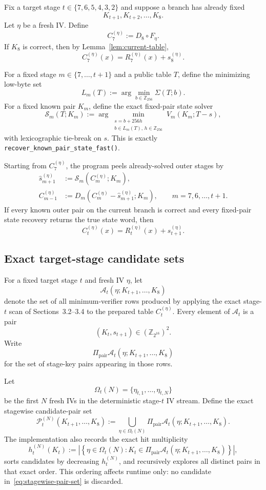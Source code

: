 \documentclass[11pt]{article}
\newcommand{\Z}[1]{\mathbb{Z}_{#1}}
\begin{document}
Fix a target stage $t\in\{7,6,5,4,3,2\}$ and suppose a branch has already fixed
\[
K_{t+1},K_{t+2},\dots,K_8.
\]
Let $\eta$ be a fresh IV. Define
\[
C_7^{(\eta)}:=D_8\circ F_\eta.
\]
If $K_8$ is correct, then by Lemma~\ref{lem:current-table},
\[
C_7^{(\eta)}(x)=R_7^{(\eta)}(x)+s_8^{(\eta)}.
\]

For a fixed stage $m\in\{7,\dots,t+1\}$ and a public table $T$, define the minimizing low-byte set
\[
L_m(T):=\arg\min_{b\in\Z{256}}\Sigma(T;b).
\]
For a fixed known pair $K_m$, define the exact fixed-pair state solver
\begin{equation}
\label{eq:fixed-pair-state-solver}
\mathcal{S}_m(T;K_m)
:=
\arg\min_{\substack{s=b+256h\\ b\in L_m(T),\,h\in\Z{256}}}
V_m(K_m;T-s),
\end{equation}
with lexicographic tie-break on $s$. This is exactly \texttt{recover\_known\_pair\_state\_fast()}.

Starting from $C_7^{(\eta)}$, the program peels already-solved outer stages by
\begin{align}
\widehat{s}_{m+1}^{(\eta)} &:= \mathcal{S}_m(C_m^{(\eta)};K_m), \label{eq:stagewise-state}\\
C_{m-1}^{(\eta)} &:= D_m\!\left(C_m^{(\eta)}-\widehat{s}_{m+1}^{(\eta)};K_m\right), \qquad m=7,6,\dots,t+1. \label{eq:stagewise-peel}
\end{align}
If every known outer pair on the current branch is correct and every fixed-pair state recovery returns the true state word, then
\[
C_t^{(\eta)}(x)=R_t^{(\eta)}(x)+s_{t+1}^{(\eta)}.
\]

\subsection{Exact target-stage candidate sets}
For a fixed target stage $t$ and fresh IV $\eta$, let
\[
\mathcal{A}_t(\eta;K_{t+1},\dots,K_8)
\]
denote the set of all minimum-verifier rows produced by applying the exact stage-$t$ scan of Sections~3.2--3.4 to the prepared table $C_t^{(\eta)}$. Every element of $\mathcal{A}_t$ is a pair
\[
(K_t,s_{t+1})\in(\Z{2^{16}})^2.
\]
Write
\[
\Pi_{\mathrm{pair}}\mathcal{A}_t(\eta;K_{t+1},\dots,K_8)
\]
for the set of stage-key pairs appearing in those rows.

Let
\[
\Omega_t(N)=\{\eta_{t,1},\dots,\eta_{t,N}\}
\]
be the first $N$ fresh IVs in the deterministic stage-$t$ IV stream. Define the exact stagewise candidate-pair set
\begin{equation}
\label{eq:stagewise-pair-set}
\mathcal{P}_t^{(N)}(K_{t+1},\dots,K_8)
:=
\bigcup_{\eta\in\Omega_t(N)}
\Pi_{\mathrm{pair}}\mathcal{A}_t(\eta;K_{t+1},\dots,K_8).
\end{equation}
The implementation also records the exact hit multiplicity
\begin{equation}
\label{eq:stagewise-hit-count}
h_t^{(N)}(K_t)
:=
\left|
\left\{
\eta\in\Omega_t(N):
K_t\in\Pi_{\mathrm{pair}}\mathcal{A}_t(\eta;K_{t+1},\dots,K_8)
\right\}
\right|,
\end{equation}
sorts candidates by decreasing $h_t^{(N)}$, and recursively explores all distinct pairs in that exact order. This ordering affects runtime only: no candidate in~\eqref{eq:stagewise-pair-set} is discarded.
\end{document}
